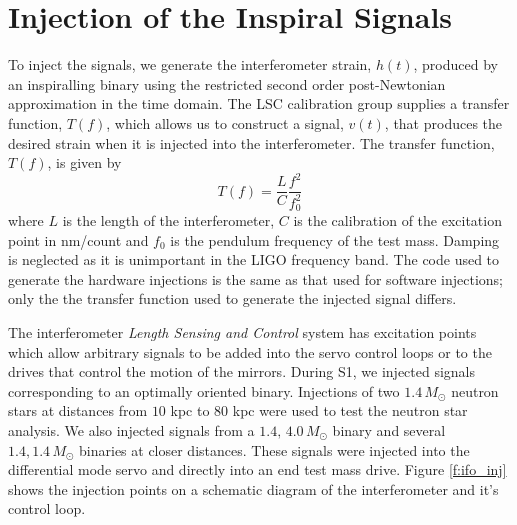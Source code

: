 \section{Injection of the Inspiral Signals}
\label{s:injecting}

To inject the signals, we generate the interferometer strain, $h(t)$, produced
by an inspiralling binary using the restricted second order post-Newtonian
approximation in the time domain\cite{biww}.  The LSC calibration group
supplies a transfer function, $T(f)$, which allows us to construct a signal,
$v(t)$, that produces the desired strain when it is injected into the
interferometer.  The transfer function, $T(f)$, is given by \begin{equation}
T(f) = \frac{L}{C}\frac{f^2}{f_0^2}
\end{equation}
where $L$ is the length of the interferometer, $C$ is the calibration of the
excitation point in nm/count and $f_0$ is the pendulum frequency of the test
mass. Damping is neglected as it is unimportant in the LIGO frequency band.
The code used to generate the hardware injections is the same as that used
for software injections; only the the transfer function used to generate the
injected signal differs.

The interferometer \emph{Length Sensing and Control} system\cite{abbott2003a}
has excitation points which allow arbitrary signals to be added into the servo
control loops or to the drives that control the motion of the
mirrors\cite{shawhan2002}. 
During S1, we injected signals corresponding to an optimally oriented binary.
Injections of two $1.4\,M_\odot$ neutron stars at distances from $10$ kpc to
$80$ kpc were used to test the neutron star analysis. 
We also injected signals from a $1.4,\,4.0\,M_\odot$ binary and several
$1.4,1.4\,M_\odot$ binaries at closer distances.  These signals were injected
into the differential mode servo and directly into an end test mass drive.
Figure \ref{f:ifo_inj} shows the injection points on a schematic diagram of
the interferometer and it's control loop.

